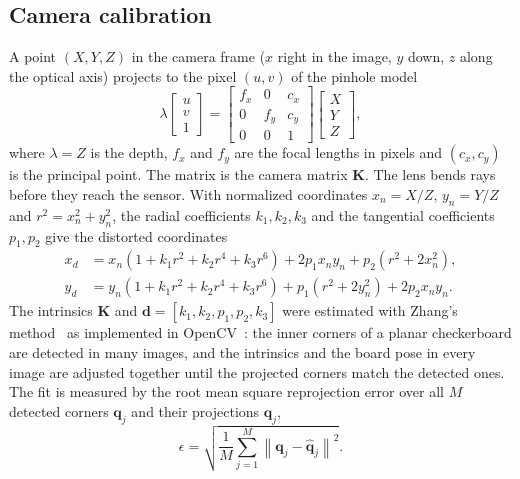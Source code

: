 \documentclass[conference]{IEEEtran}
\newcommand{\vect}[1]{\boldsymbol{#1}}
\begin{document}
\subsection{Camera calibration}
A point $(X, Y, Z)$ in the camera frame ($x$ right in the image, $y$ down, $z$ along the optical axis) projects to the pixel $(u, v)$ of the pinhole model
\begin{equation}
\lambda \begin{bmatrix} u \\ v \\ 1 \end{bmatrix} =
\begin{bmatrix} f_x & 0 & c_x \\ 0 & f_y & c_y \\ 0 & 0 & 1 \end{bmatrix}
\begin{bmatrix} X \\ Y \\ Z \end{bmatrix},
\label{eq:pinhole}
\end{equation}
where $\lambda = Z$ is the depth, $f_x$ and $f_y$ are the focal lengths in pixels and $(c_x, c_y)$ is the principal point. The matrix is the camera matrix $\vect{K}$. The lens bends rays before they reach the sensor. With normalized coordinates $x_n = X/Z$, $y_n = Y/Z$ and $r^2 = x_n^2 + y_n^2$, the radial coefficients $k_1, k_2, k_3$ and the tangential coefficients $p_1, p_2$ give the distorted coordinates
\begin{equation}
\begin{aligned}
x_d &= x_n (1 + k_1 r^2 + k_2 r^4 + k_3 r^6) + 2 p_1 x_n y_n + p_2 (r^2 + 2 x_n^2),\\
y_d &= y_n (1 + k_1 r^2 + k_2 r^4 + k_3 r^6) + p_1 (r^2 + 2 y_n^2) + 2 p_2 x_n y_n.
\end{aligned}
\label{eq:distortion}
\end{equation}
The intrinsics $\vect{K}$ and $\vect{d} = [k_1, k_2, p_1, p_2, k_3]$ were estimated with Zhang's method~\cite{zhang2000} as implemented in OpenCV~\cite{bradski2000}: the inner corners of a planar checkerboard are detected in many images, and the intrinsics and the board pose in every image are adjusted together until the projected corners match the detected ones. The fit is measured by the root mean square reprojection error over all $M$ detected corners $\vect{q}_j$ and their projections $\hat{\vect{q}}_j$,
\begin{equation}
\epsilon = \sqrt{\frac{1}{M} \sum_{j=1}^{M} \left\| \vect{q}_j - \hat{\vect{q}}_j \right\|^2 }.
\label{eq:rms}
\end{equation}
\end{document}
